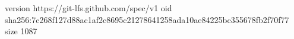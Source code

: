 version https://git-lfs.github.com/spec/v1
oid sha256:7c268f127d88ac1af2c8695c21278641258ada10ae84225bc355678fb2f70f77
size 1087
